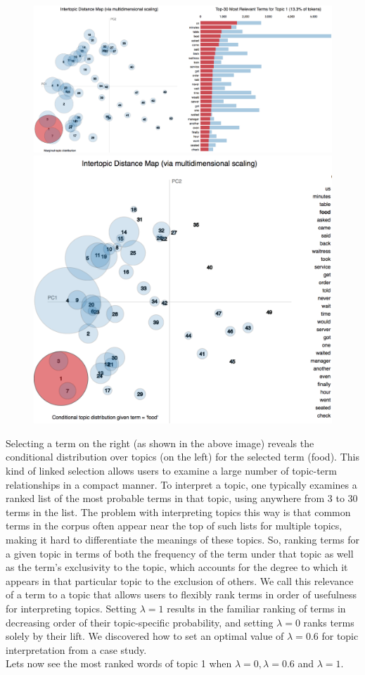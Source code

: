 \documentclass{neu_handout}
\begin{document}
\begin{figure}[h]
\centering
{
\includegraphics[width=0.5\linewidth]{second_image}
}
{
\includegraphics[width=0.3\linewidth]{third_image}
}
\end{figure}

Selecting a term on the right (as shown in the above image)  reveals the conditional distribution over topics (on the left) for the selected term (food). This kind of linked selection allows users to examine a large number of topic-term relationships in a compact manner.
To interpret a topic, one typically examines a ranked list of the most probable terms in that topic, using anywhere from 3 to 30 terms in the list. The problem with interpreting topics this way is that common terms in the corpus often appear near the top of such lists for multiple topics, making it hard to differentiate the meanings of these topics. So, ranking terms for a given topic in terms of both the frequency of the term under that topic as well as the term’s exclusivity to the topic, which accounts for the degree to which it appears in that particular topic to the exclusion of others. We call this relevance of a term to a topic that allows users to flexibly rank terms in order of usefulness for interpreting topics. Setting $\lambda = 1$ results in the familiar ranking of terms in decreasing order of their topic-specific probability, and setting $\lambda = 0$ ranks terms solely by their lift. We discovered how to set an optimal value of $\lambda = 0.6$ for topic interpretation from a case study.\\

Lets now see the most ranked words of topic 1 when $\lambda = 0, \lambda = 0.6$ and $\lambda = 1$.
\end{document}
